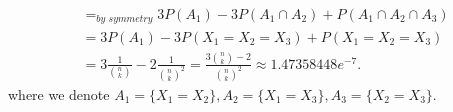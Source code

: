 \begin{exercise}
\begin{solution}
\begin{enumerate}
\begin{enumerate}
\begin{align*}
				& =_{\textit{by symmetry}} 3 P(A_1) - 3 P(A_1 \cap A_2) + P(A_1\cap A_2\cap A_3)\\
				& =   3 P(A_1) - 3 P(X_1=X_2=X_3) + P(X_1=X_2=X_3)\\
				& =  3 \frac{1}{{n \choose k} }   - 2  \frac{1}{{n \choose k}^2 }=    \frac{3{n \choose k}-2}{{n \choose k}^2 } \approx 1.47358448e^{-7}.
			\end{align*}
			where we denote $A_1=\{X_1=X_2\}, A_2=\{X_1=X_3\}, A_3=\{X_2=X_3\}$. 
		\end{enumerate}
		\end{enumerate}
	\end{solution}	
\end{exercise}








